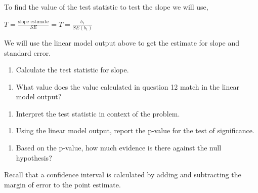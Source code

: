 \documentclass[
]{report}
\providecommand{\tightlist}{%
  \setlength{\itemsep}{0pt}\setlength{\parskip}{0pt}}
\begin{document}
To find the value of the test statistic to test the slope we will use,

\(T = \frac{\mbox{slope estimate}}{SE} = T = \frac{b_1}{SE(b_1)}\)

We will use the linear model output above to get the estimate for slope and standard error.

\begin{enumerate}
\def\labelenumi{\arabic{enumi}.}
\setcounter{enumi}{11}
\tightlist
\item
  Calculate the test statistic for slope.
\end{enumerate}

\vspace{1in}

\begin{enumerate}
\def\labelenumi{\arabic{enumi}.}
\setcounter{enumi}{12}
\tightlist
\item
  What value does the value calculated in question 12 match in the linear model output?
\end{enumerate}

\vspace{0.5in}

\begin{enumerate}
\def\labelenumi{\arabic{enumi}.}
\setcounter{enumi}{13}
\tightlist
\item
  Interpret the test statistic in context of the problem.
\end{enumerate}

\vspace{1in}

\begin{enumerate}
\def\labelenumi{\arabic{enumi}.}
\setcounter{enumi}{14}
\tightlist
\item
  Using the linear model output, report the p-value for the test of significance.
\end{enumerate}

\vspace{0.5in}

\begin{enumerate}
\def\labelenumi{\arabic{enumi}.}
\setcounter{enumi}{15}
\tightlist
\item
  Based on the p-value, how much evidence is there against the null hypothesis?
\end{enumerate}

\vspace{0.5in}

Recall that a confidence interval is calculated by adding and subtracting the margin of error to the point estimate.
\end{document}
